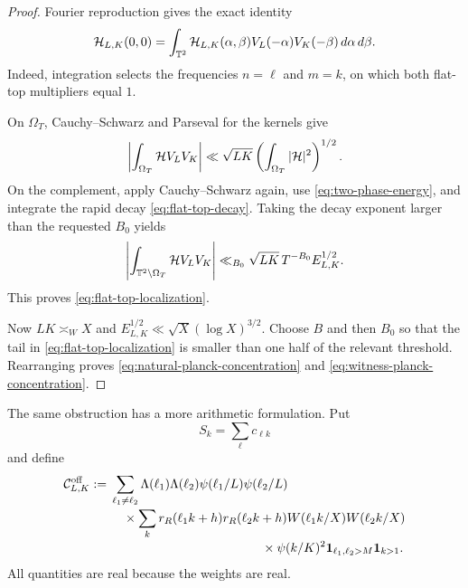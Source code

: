 \begin{proof}
Fourier reproduction gives the exact identity
\begin{equation}
 \mathcal H_{L,K}(0,0)
 =\int_{\mathbb T^2}\mathcal H_{L,K}(\alpha,\beta)
 V_L(-\alpha)V_K(-\beta)\,d\alpha\,d\beta.
 \label{eq:flat-top-reproduction}
\end{equation}
Indeed, integration selects the frequencies $n=\ell$ and $m=k$, on
which both flat-top multipliers equal $1$.

On $\Omega_T$, Cauchy--Schwarz and Parseval for the kernels give
\[
 \left|\int_{\Omega_T}\mathcal H V_LV_K\right|
 \ll\sqrt{LK}
 \left(\int_{\Omega_T}|\mathcal H|^2\right)^{1/2}.
\]
On the complement, apply Cauchy--Schwarz again, use
\eqref{eq:two-phase-energy}, and integrate the rapid decay
\eqref{eq:flat-top-decay}.  Taking the decay exponent larger than the
requested $B_0$ yields
\[
 \left|\int_{\mathbb T^2\setminus\Omega_T}\mathcal H V_LV_K\right|
 \ll_{B_0}\sqrt{LK}\,T^{-B_0}E_{L,K}^{1/2}.
\]
This proves \eqref{eq:flat-top-localization}.

Now $LK\asymp_WX$ and
$E_{L,K}^{1/2}\ll\sqrt X(\log X)^{3/2}$.  Choose $B$ and then $B_0$
so that the tail in \eqref{eq:flat-top-localization} is smaller than
one half of the relevant threshold.  Rearranging proves
\eqref{eq:natural-planck-concentration} and
\eqref{eq:witness-planck-concentration}.
\end{proof}

The same obstruction has a more arithmetic formulation.  Put
\begin{equation}
 S_k=\sum_\ell c_{\ell k}
 \label{eq:row-compressed-coefficient}
\end{equation}
and define
\begin{align}
 \cC^{\mathrm{off}}_{L,K}
 :={}&\sum_{\ell_1\ne\ell_2}
 \Lambda(\ell_1)\Lambda(\ell_2)
 \psi(\ell_1/L)\psi(\ell_2/L)
 \notag\\[-0.2em]
 &\quad\times\sum_k
 r_R(\ell_1k+h)r_R(\ell_2k+h)
 W(\ell_1k/X)W(\ell_2k/X)
 \notag\\[-0.2em]
 &\hspace{12em}\times\psi(k/K)^2
 \one_{\ell_1,\ell_2>M}\one_{k>1}.
 \label{eq:offdiagonal-correlation}
\end{align}
All quantities are real because the weights are real.

